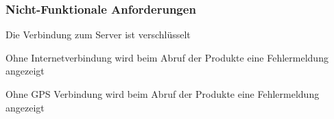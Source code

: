 \subsubsection{Nicht-Funktionale Anforderungen}
\begin{todolist}
	\item[\done] Die Verbindung zum Server ist verschlüsselt
	\item[\done] Ohne Internetverbindung wird beim Abruf der Produkte eine Fehlermeldung angezeigt
	\item[\done] Ohne GPS Verbindung wird beim Abruf der Produkte eine Fehlermeldung angezeigt
\end{todolist}





